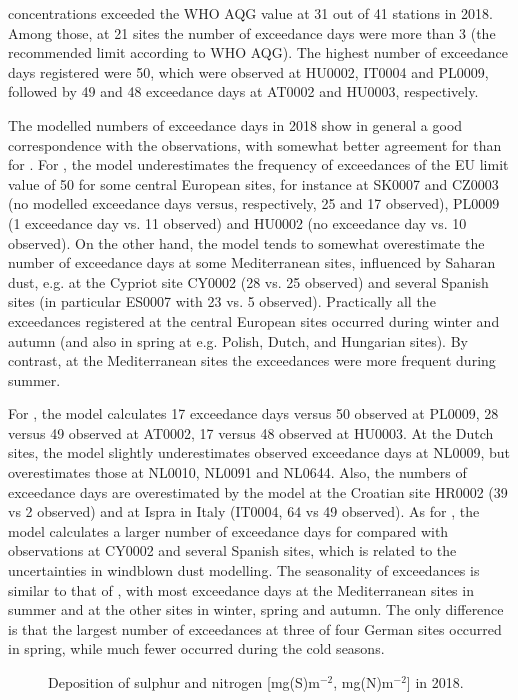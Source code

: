 \PM[2.5] concentrations exceeded the WHO AQG value at 31 out of 41
stations in 2018. Among those, at 21 sites the number of exceedance
days were more than 3 (the recommended limit according to WHO AQG). 
The highest number of exceedance days registered were 50, which were observed at HU0002, IT0004 and PL0009, followed by 49 and 48 exceedance days at AT0002 and HU0003, respectively.

The modelled numbers of exceedance days in 2018 show in general a good correspondence with the observations, with somewhat better agreement for \PM[10] than for \PM[2.5]. For \PM[10], the model underestimates the frequency of exceedances of the EU limit value of 50 \ug for some central European sites, for instance at SK0007 and CZ0003 (no modelled exceedance days versus, respectively, 25 and 17 observed), PL0009 (1 exceedance day vs. 11 observed) and HU0002 (no exceedance day vs. 10 observed). On the other hand, the model tends to somewhat overestimate the number of exceedance days at some Mediterranean sites, influenced by Saharan dust, e.g. at the Cypriot site CY0002 (28 vs. 25 observed) and several Spanish sites (in particular ES0007 with 23 vs. 5 observed). Practically all the exceedances registered at the central European sites occurred during winter and autumn (and also in spring at e.g. Polish, Dutch, and Hungarian sites). By contrast, at the Mediterranean sites the exceedances were more frequent during summer.

For \PM[2.5], the model calculates 17 exceedance days versus 50 observed at PL0009, 28 versus 49 observed at AT0002, 17 versus 48 observed at HU0003. At the Dutch sites, the model slightly underestimates observed \PM[2.5] exceedance days at NL0009, but overestimates those at NL0010, NL0091 and NL0644. Also, the numbers of exceedance days are overestimated by the model at the Croatian site HR0002 (39 vs 2 observed) and at Ispra in Italy (IT0004, 64 vs 49 observed). As for \PM[10], the model calculates a larger number of exceedance days for \PM[2.5] compared with observations at CY0002 and several Spanish sites, which is related to the uncertainties in windblown dust modelling. The seasonality of \PM[2.5] exceedances is similar to that of \PM[10], with most exceedance days at the Mediterranean sites in summer and at the other sites in winter, spring and autumn. The only difference is that the largest number of \PM[2.5] exceedances at three of four German sites occurred in spring, while much fewer occurred during the cold seasons.

\begin{figure}[H]
  \centering
 \caption{Deposition of sulphur and nitrogen [mg(S)m$^{-2}$, mg(N)m$^{-2}$] in 2018.}
\label{deps}
\end{figure}


